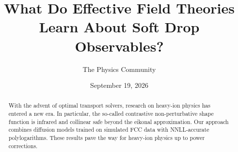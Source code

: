 \documentclass[11pt]{article}
\title{What Do Effective Field Theories Learn About Soft Drop Observables?}
\author{The Physics Community}
\date{September 19, 2026}
\numberwithin{equation}{section}
\theoremstyle{definition}
\theoremstyle{remark}
\begin{document}
\maketitle
\begin{abstract}
With the advent of optimal transport solvers, research on heavy-ion
physics has entered a new era. In particular, the so-called contrastive
non-perturbative shape function is infrared and collinear safe beyond
the eikonal approximation. Our approach combines diffusion models
trained on simulated FCC data with NNLL-accurate polylogarithms. These
results pave the way for heavy-ion physics up to power corrections.
\end{abstract}
\tableofcontents





\nocite{*}


\end{document}
